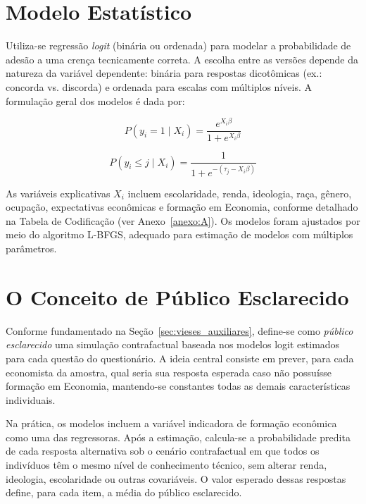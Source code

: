 \section{Modelo Estatístico}

Utiliza-se regressão \textit{logit} (binária ou ordenada) para modelar a probabilidade de adesão a uma crença tecnicamente correta. A escolha entre as versões depende da natureza da variável dependente: binária para respostas dicotômicas (ex.: concorda vs. discorda) e ordenada para escalas com múltiplos níveis. A formulação geral dos modelos é dada por:

\begin{equation}
P(y_i = 1 \mid X_i) = \frac{e^{X_i \beta}}{1 + e^{X_i \beta}}
\end{equation}

\begin{equation}
P(y_i \leq j \mid X_i) = \frac{1}{1 + e^{-(\tau_j - X_i \beta)}}
\end{equation}

As variáveis explicativas \(X_i\) incluem escolaridade, renda, ideologia, raça, gênero, ocupação, expectativas econômicas e formação em Economia, conforme detalhado na Tabela de Codificação (ver Anexo~\ref{anexo:A}). Os modelos foram ajustados por meio do algoritmo L-BFGS, adequado para estimação de modelos com múltiplos parâmetros.

\section{O Conceito de Público Esclarecido}

Conforme fundamentado na Seção~\ref{sec:vieses_auxiliares}, define-se como \textit{público esclarecido} uma simulação contrafactual baseada nos modelos logit estimados para cada questão do questionário. A ideia central consiste em prever, para cada economista da amostra, qual seria sua resposta esperada caso não possuísse formação em Economia, mantendo-se constantes todas as demais características individuais.

Na prática, os modelos incluem a variável indicadora de formação econômica como uma das regressoras. Após a estimação, calcula-se a probabilidade predita de cada resposta alternativa sob o cenário contrafactual em que todos os indivíduos têm o mesmo nível de conhecimento técnico, sem alterar renda, ideologia, escolaridade ou outras covariáveis. O valor esperado dessas respostas define, para cada item, a média do público esclarecido.

